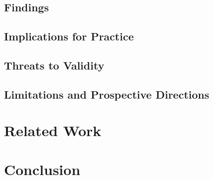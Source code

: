 \documentclass[review]{elsarticle}
\begin{document}
\subsection{Findings}\label{sec:findings}


\subsection{Implications for Practice}\label{sec:implications}


\subsection{Threats to Validity}\label{sec:threats}


\subsection{Limitations and Prospective Directions}\label{sec:limitations}


\section{Related Work} \label{sec:related_works}


\section{Conclusion} \label{sec:conclusions}


%


\end{document}
